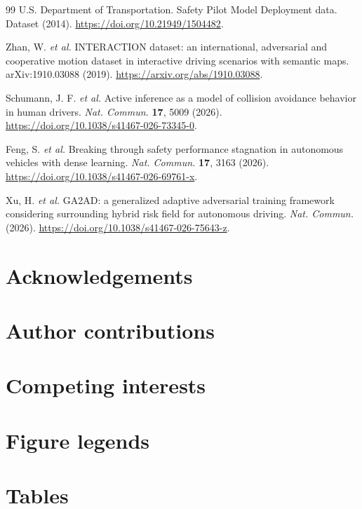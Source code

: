 \documentclass[10pt,a4paper,twocolumn]{article}
\begin{document}
\begin{thebibliography}{99}
U.S. Department of Transportation. Safety Pilot Model Deployment data. Dataset (2014). \url{https://doi.org/10.21949/1504482}.

Zhan, W. \textit{et al.} INTERACTION dataset: an international, adversarial and cooperative motion dataset in interactive driving scenarios with semantic maps. arXiv:1910.03088 (2019). \url{https://arxiv.org/abs/1910.03088}.

Schumann, J. F. \textit{et al.} Active inference as a model of collision avoidance behavior in human drivers. \textit{Nat. Commun.} \textbf{17}, 5009 (2026). \url{https://doi.org/10.1038/s41467-026-73345-0}.

Feng, S. \textit{et al.} Breaking through safety performance stagnation in autonomous vehicles with dense learning. \textit{Nat. Commun.} \textbf{17}, 3163 (2026). \url{https://doi.org/10.1038/s41467-026-69761-x}.

Xu, H. \textit{et al.} GA2AD: a generalized adaptive adversarial training framework considering surrounding hybrid risk field for autonomous driving. \textit{Nat. Commun.} (2026). \url{https://doi.org/10.1038/s41467-026-75643-z}.

\end{thebibliography}
\endgroup

\section*{Acknowledgements}

\section*{Author contributions}

\section*{Competing interests}

\section*{Figure legends}

\section*{Tables}
\end{document}
